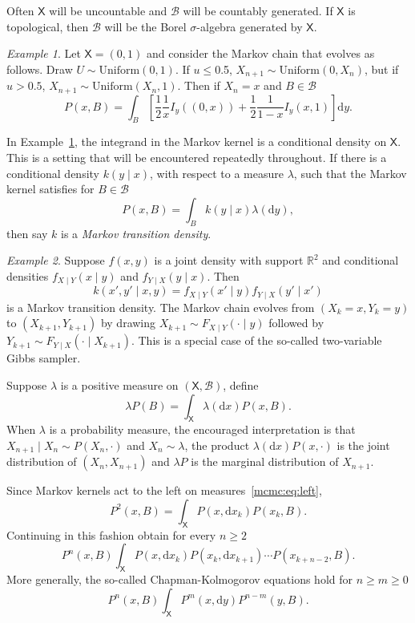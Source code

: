 \documentclass[12pt]{article}
\theoremstyle{plain}
\theoremstyle{definition}
\theoremstyle{remark}
\newtheorem{example}{Example}[section]
\newcommand{\df}{\mathrm{d}}
\newcommand{\X}{\mathsf{X}}
\newcommand{\B}{\mathcal{B}}
\begin{document}
Often $\X$ will be uncountable and $\B$ will be countably
generated.  If $\X$ is topological, then $\B$ will be the Borel
$\sigma$-algebra generated by $\X$.

\begin{example}
  \label{mcmc:ex:betawalk}
 Let $\X  = (0,1)$ and consider the Markov chain that evolves as
 follows. Draw $U \sim \text{Uniform}(0,1)$.  If $u \le 0.$5, $X_{n+1}
 \sim \text{Uniform}(0, X_n)$, but if $u > 0.5$, $X_{n+1}
 \sim \text{Uniform}(X_n, 1)$.  Then if $X_n = x$ and $B \in \B$
 \[
P(x, B) = \int_{B} \left[ \frac{1}{2} \frac{1}{x} I_{y}((0,x)) +
  \frac{1}{2} \frac{1}{1-x} I_{y}(x,1) \right] \df y .
 \]
\end{example}

In Example~\ref{mcmc:ex:betawalk}, the integrand in the Markov kernel
is a conditional density on $\X$.  This is a setting that will be
encountered repeatedly throughout.  If there is a conditional density
$k (y \mid x)$, with respect to a measure $\lambda$, such that the Markov kernel satisfies for $B \in \B$
\[
P(x, B) = \int_{B} k(y \mid x) \lambda(\df y),
\]
then say $k$ is a {\em Markov transition density}.

\begin{example}
  \label{mcmc:ex:2varGS}
Suppose $f(x,y)$ is a joint density with support $\mathbb{R}^2$ and
conditional densities $f_{X \mid Y}(x \mid y)$ and $f_{Y \mid X}(y
\mid x)$.  Then
\[
  k(x', y' \mid x, y) = f_{X \mid Y}(x' \mid y) f_{Y \mid X}(y' \mid x')
\]
is a Markov transition density.  The Markov chain evolves from
$(X_k = x, Y_k =y)$ to $(X_{k+1}, Y_{k+1})$ by drawing
$X_{k+1} \sim F_{X \mid Y} (\cdot \mid y)$ followed by
$Y_{k+1} \sim F_{Y \mid X}(\cdot \mid X_{k+1})$.  This is a special
case of the so-called two-variable Gibbs sampler.
\end{example}


Suppose $\lambda$ is a positive measure on $(\X, \B)$,  define
\begin{equation}
  \label{mcmc:eq:left}
\lambda P(B) = \int_{\X} \lambda(\df x) P(x, B) .
\end{equation}
When $\lambda$ is a probability measure, the encouraged interpretation
is that $X_{n+1} \mid X_{n} \sim P(X_{n}, \cdot)$ and
$X_{n} \sim \lambda$, the product $\lambda(\df x) P(x, \cdot)$ is the
joint distribution of $(X_n, X_{n+1})$ and $\lambda P$ is the marginal
distribution of $X_{n+1}$.

Since Markov kernels act to the left on measures~\eqref{mcmc:eq:left},
\[
P^2(x, B) = \int_{\X} P(x, \df x_k) P(x_k, B) .
\]
Continuing in this fashion obtain for every $n \ge 2$
\[
P^n(x, B) \int_{\X} P(x, \df x_k) P(x_k, \df x_{k+1}) \cdots P(x_{k +
  n -2}, B) .
\]
More generally, the so-called Chapman-Kolmogorov equations hold for $n
\ge m \ge 0$
\[
P^n(x, B) \int_{\X} P^m(x, \df y) P^{n-m} (y, B) .
\]
\end{document}
